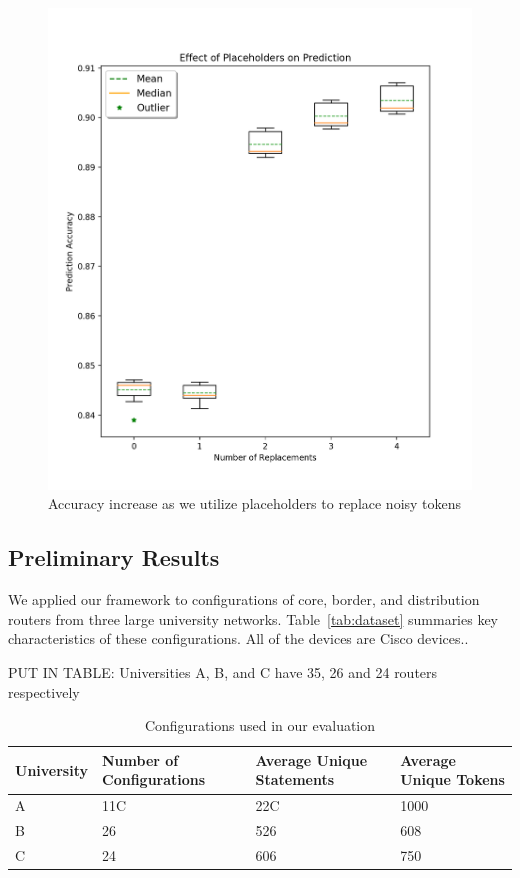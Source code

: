 \begin{figure}
	\centering
	\includegraphics[width=\columnwidth]{replacement_analysis.png}
	\caption{Accuracy increase as we utilize placeholders to replace noisy tokens}
    \label{fig:replacement_analysis}
\end{figure}

\subsection{Preliminary Results}

We applied our framework to configurations of core, border, and distribution
routers from three large university networks. Table~\ref{tab:dataset}
summaries key characteristics of these configurations. All of the devices are Cisco devices.. 


PUT IN TABLE: Universities A, B, and C have 35, 26 and 24 routers respectively


\begin{table}
    \small
    \begin{tabular}{ | p{1.5cm} | p{1.5cm}| p{2cm} |  p{1.5cm} |} 
    \hline
    University & Number of Configurations & Average Unique Statements & Average Unique Tokens \\ \hline
    A & 11C & 22C &1000 \\  \hline
    B & 26 & 526 & 608  \\ \hline
    C & 24 & 606 & 750\\  \hline
    \end{tabular}
    \caption{Configurations used in our evaluation}
    \label{tab:datasets}
\end{table}

